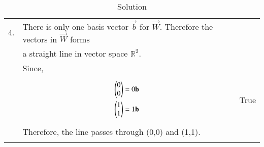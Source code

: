 \documentclass[journal,12pt]{IEEEtran}
\begin{document}
\begin{longtable}{|l|l|l|}
\hline
4.&There is only one basis vector $\vec{b}$ for $\vec{W}$. Therefore the vectors in $\vec{W}$ forms &\\&a straight line in vector space $\mathbb{R}^2$.&\\&Since,&\\&\parbox{13cm}{\begin{align}
    \begin{pmatrix}0\\0\end{pmatrix}=0\mathbf{b}\\
    \begin{pmatrix}1\\1\end{pmatrix}=1\mathbf{b}
\end{align}}&True\\&Therefore, the line passes through (0,0) and (1,1).&\\
\hline
\caption{Solution}
\label{sol}
\end{longtable}
\end{document}
